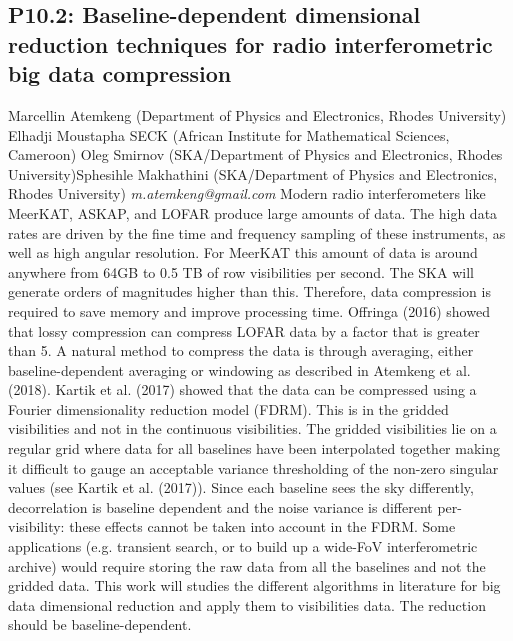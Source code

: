 \documentclass{report}
\begin{document}
\subsection*{P10.2: Baseline-dependent dimensional reduction techniques for radio interferometric big data compression}
\bigskip
Marcellin Atemkeng (Department of Physics and Electronics, Rhodes University) \newline Elhadji Moustapha SECK (African Institute for Mathematical Sciences, Cameroon) \newline  Oleg Smirnov (SKA/Department of Physics and Electronics, Rhodes University)\newline  Sphesihle Makhathini (SKA/Department of Physics and Electronics, Rhodes University)\newline  \newline  \newline\newline
{\it m.atemkeng@gmail.com}\newline
\newline\newline
Modern radio interferometers like MeerKAT, ASKAP, and LOFAR produce large amounts of data. The high data rates are driven by the fine time and frequency sampling of these instruments, as well as high angular resolution. For MeerKAT this amount of data is around anywhere from 64GB to 0.5 TB of row visibilities per second. The SKA will generate orders of magnitudes higher than this.
Therefore, data compression is required to save memory and improve processing time. Offringa (2016) showed that lossy compression can compress LOFAR data by a factor that is greater than 5. A natural method to compress the data is through averaging, either baseline-dependent averaging or windowing as described in Atemkeng et al. (2018). Kartik et al. (2017) showed that the data can be compressed using a Fourier dimensionality reduction model (FDRM). This is in the gridded visibilities and not in the continuous visibilities. The gridded visibilities lie on a regular grid where data for all baselines have been interpolated
together making it difficult to gauge an acceptable variance thresholding of the non-zero singular
values (see Kartik et al. (2017)). Since each baseline sees the sky differently, decorrelation is baseline dependent and the noise variance is different per-visibility: these effects cannot be taken into account in the FDRM. Some applications (e.g. transient search, or to build up a wide-FoV interferometric archive)
would require storing the raw data from all the baselines and not the gridded data.
This work will studies the different algorithms in literature for big data dimensional reduction and apply them to visibilities data. The reduction should be
baseline-dependent.\newline
\newpage
\end{document}
